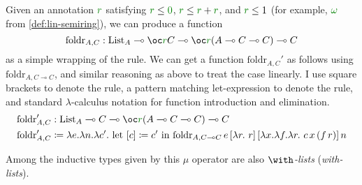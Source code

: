 \begin{example}
  Given an annotation $\gr r$ satisfying $\gr r \leq \gr0$,
  $\gr r \leq \gr r + \gr r$, and $\gr r \leq 1$ (for example, $\gr\omega$ from
  \cref{def:lin-semiring}), we can produce a function
  \[
    \mathrm{foldr}_{A,C} : \mathrm{List}_A \multimap \oc\gr rC \multimap
    \oc\gr r\plr{A \multimap C \multimap C} \multimap C
  \]
  as a simple wrapping of the  rule.
  We can get a function $\mathrm{foldr}_{A,C}'$ as follows using
  $\mathrm{foldr}_{A,C \multimap C}$, and similar reasoning as above to
  treat the  case linearly.
  I use square brackets to denote the  rule, a pattern
  matching let-expression to denote the  rule, and standard
  $\lambda$-calculus notation for function introduction and elimination.
  \begin{align*}
    \mathrm{foldr}_{A,C}' &: \mathrm{List}_A \multimap C \multimap
    \oc\gr r\plr{A \multimap C \multimap C} \multimap C \\
    \mathrm{foldr}_{A,C}' &\coloneqq \lambda e.\lambda n.\lambda c'.~%
                            \textrm{let }[c] \coloneqq c'\textrm{ in }
                            \mathrm{foldr}_{A,C \multimap C}\,e\,
                            [\lambda r.~r]\,
                            [\lambda x.\lambda f.\lambda r.~c\,x\,(f\,r)]\,
                            n
  \end{align*}
\end{example}

Among the inductive types given by this $\mu$ operator are also
\emph{$\with$-lists} (\emph{with-lists}).

